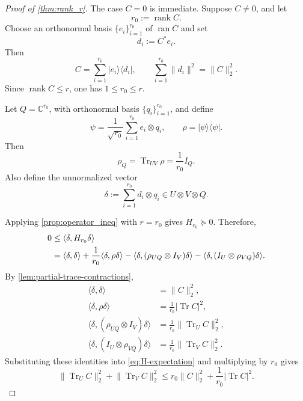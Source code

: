\documentclass[11pt,reqno]{amsart}
\theoremstyle{remark}
\DeclareMathOperator{\Tr}{Tr}
\DeclareMathOperator{\rank}{rank}
\newcommand{\ketbra}[2]{\lvert #1\rangle\!\langle #2\rvert}
\newcommand{\ip}[2]{\langle #1,#2\rangle}
\newcommand{\norm}[1]{\lVert #1\rVert}
\newcommand{\abs}[1]{\lvert #1\rvert}
\newcommand{\C}{\mathbb C}
\begin{document}
\begin{proof}[Proof of \cref{thm:rank_r}]
The case $C=0$ is immediate. Suppose $C\ne0$, and let
\[
    r_0:=\rank C.
\]
Choose an orthonormal basis
$\{e_i\}_{i=1}^{r_0}$ of $\operatorname{ran}C$ and set
\[
    d_i:=C^*e_i.
\]
Then
\begin{equation}
\label{eq:C-decomposition}
    C
    =
    \sum_{i=1}^{r_0}\ketbra{e_i}{d_i},
    \qquad
    \sum_{i=1}^{r_0}\norm{d_i}^2
    =
    \norm{C}_2^2.
\end{equation}
Since $\rank C\le r$, one has $1\le r_0\le r$.

Let $Q=\C^{r_0}$, with orthonormal basis
$\{q_i\}_{i=1}^{r_0}$, and define
\[
    \psi
    =
    \frac1{\sqrt{r_0}}
    \sum_{i=1}^{r_0}e_i\otimes q_i,
    \qquad
    \rho=\ketbra{\psi}{\psi}.
\]
Then
\[
    \rho_Q
    =
    \Tr_{UV}\rho
    =
    \frac1{r_0}I_Q.
\]
Also define the unnormalized vector
\[
    \delta
    :=
    \sum_{i=1}^{r_0}d_i\otimes q_i
    \in U\otimes V\otimes Q.
\]

Applying \cref{prop:operator_ineq} with $r=r_0$ gives
$H_{r_0}\succeq0$. Therefore,
\begin{align}
    0
    &\le
    \ip{\delta}{H_{r_0}\delta}
    \notag\\
    &=
    \ip{\delta}{\delta}
    +
    \frac1{r_0}\ip{\delta}{\rho\delta}
    -
    \ip{\delta}{
      (\rho_{UQ}\otimes I_V)\delta
    }
    -
    \ip{\delta}{
      (I_U\otimes\rho_{VQ})\delta
    }.
\label{eq:H-expectation}
\end{align}
By \cref{lem:partial-trace-contractions},
\begin{align*}
    \ip{\delta}{\delta}
    &=\norm{C}_2^2,\\
    \ip{\delta}{\rho\delta}
    &=\frac1{r_0}\abs{\Tr C}^2,\\
    \ip{\delta}{(\rho_{UQ}\otimes I_V)\delta}
    &=\frac1{r_0}\norm{\Tr_U C}_2^2,\\
    \ip{\delta}{(I_U\otimes\rho_{VQ})\delta}
    &=\frac1{r_0}\norm{\Tr_V C}_2^2.
\end{align*}
Substituting these identities into \cref{eq:H-expectation} and
multiplying by $r_0$ gives
\begin{equation}
\label{eq:main-bound-r0}
    \norm{\Tr_U C}_2^2+\norm{\Tr_V C}_2^2
    \le
    r_0\norm{C}_2^2
    +
    \frac1{r_0}\abs{\Tr C}^2.
\end{equation}


\end{proof}
\end{document}
